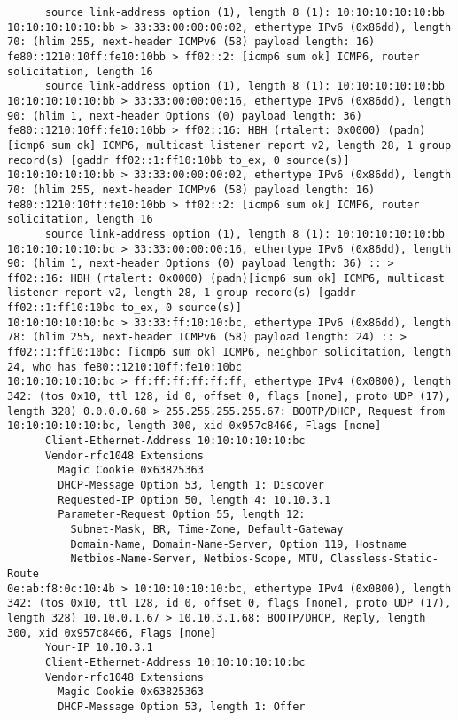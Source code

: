 \documentclass[a4paper,12pt]{article}
\begin{document}
\begin{Verbatim}
	  source link-address option (1), length 8 (1): 10:10:10:10:10:bb
10:10:10:10:10:bb > 33:33:00:00:00:02, ethertype IPv6 (0x86dd), length 70: (hlim 255, next-header ICMPv6 (58) payload length: 16) fe80::1210:10ff:fe10:10bb > ff02::2: [icmp6 sum ok] ICMP6, router solicitation, length 16
	  source link-address option (1), length 8 (1): 10:10:10:10:10:bb
10:10:10:10:10:bb > 33:33:00:00:00:16, ethertype IPv6 (0x86dd), length 90: (hlim 1, next-header Options (0) payload length: 36) fe80::1210:10ff:fe10:10bb > ff02::16: HBH (rtalert: 0x0000) (padn)[icmp6 sum ok] ICMP6, multicast listener report v2, length 28, 1 group record(s) [gaddr ff02::1:ff10:10bb to_ex, 0 source(s)]
10:10:10:10:10:bb > 33:33:00:00:00:02, ethertype IPv6 (0x86dd), length 70: (hlim 255, next-header ICMPv6 (58) payload length: 16) fe80::1210:10ff:fe10:10bb > ff02::2: [icmp6 sum ok] ICMP6, router solicitation, length 16
	  source link-address option (1), length 8 (1): 10:10:10:10:10:bb
10:10:10:10:10:bc > 33:33:00:00:00:16, ethertype IPv6 (0x86dd), length 90: (hlim 1, next-header Options (0) payload length: 36) :: > ff02::16: HBH (rtalert: 0x0000) (padn)[icmp6 sum ok] ICMP6, multicast listener report v2, length 28, 1 group record(s) [gaddr ff02::1:ff10:10bc to_ex, 0 source(s)]
10:10:10:10:10:bc > 33:33:ff:10:10:bc, ethertype IPv6 (0x86dd), length 78: (hlim 255, next-header ICMPv6 (58) payload length: 24) :: > ff02::1:ff10:10bc: [icmp6 sum ok] ICMP6, neighbor solicitation, length 24, who has fe80::1210:10ff:fe10:10bc
10:10:10:10:10:bc > ff:ff:ff:ff:ff:ff, ethertype IPv4 (0x0800), length 342: (tos 0x10, ttl 128, id 0, offset 0, flags [none], proto UDP (17), length 328) 0.0.0.0.68 > 255.255.255.255.67: BOOTP/DHCP, Request from 10:10:10:10:10:bc, length 300, xid 0x957c8466, Flags [none]
	  Client-Ethernet-Address 10:10:10:10:10:bc
	  Vendor-rfc1048 Extensions
	    Magic Cookie 0x63825363
	    DHCP-Message Option 53, length 1: Discover
	    Requested-IP Option 50, length 4: 10.10.3.1
	    Parameter-Request Option 55, length 12: 
	      Subnet-Mask, BR, Time-Zone, Default-Gateway
	      Domain-Name, Domain-Name-Server, Option 119, Hostname
	      Netbios-Name-Server, Netbios-Scope, MTU, Classless-Static-Route
0e:ab:f8:0c:10:4b > 10:10:10:10:10:bc, ethertype IPv4 (0x0800), length 342: (tos 0x10, ttl 128, id 0, offset 0, flags [none], proto UDP (17), length 328) 10.10.0.1.67 > 10.10.3.1.68: BOOTP/DHCP, Reply, length 300, xid 0x957c8466, Flags [none]
	  Your-IP 10.10.3.1
	  Client-Ethernet-Address 10:10:10:10:10:bc
	  Vendor-rfc1048 Extensions
	    Magic Cookie 0x63825363
	    DHCP-Message Option 53, length 1: Offer

\end{Verbatim}
\end{document}
